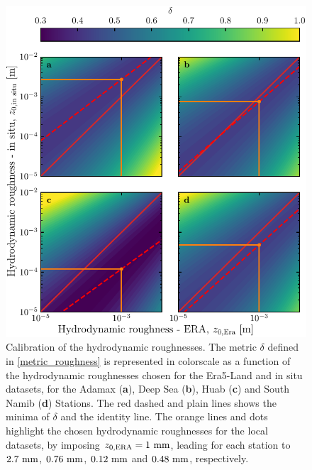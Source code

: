 \begin{figure}
  \centering
  \includegraphics[scale=1]{Figures/Figure3_supp.pdf}
  \caption{Calibration of the hydrodynamic roughnesses. The metric $\delta$ defined in \eqref{metric_roughness} is represented in colorscale as a function of the hydrodynamic roughnesses chosen for the Era5-Land and in situ datasets, for the Adamax (\textbf{a}), Deep Sea (\textbf{b}), Huab (\textbf{c}) and South Namib (\textbf{d}) Stations. The red dashed and plain lines shows the minima of $\delta$ and the identity line. The orange lines and dots highlight the chosen hydrodynamic roughnesses for the local datasets, by imposing $z_{0, \textup{\textup{ERA}}} = 1~\textup{mm}$, leading for each station to $2.7~\textup{mm}$, $0.76~\textup{mm}$, $0.12~\textup{mm}$ and $0.48~\textup{mm}$, respectively.}
  \label{Fig3_supp}
\end{figure}


